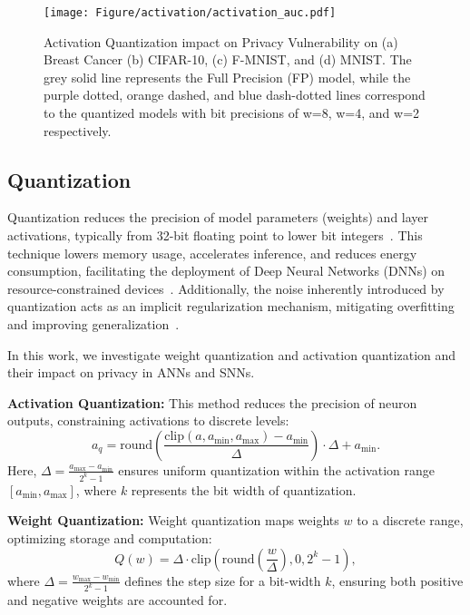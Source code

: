 \begin{figure*}[ht]
    \centering
    \texttt{[image: Figure/activation/activation\_auc.pdf]}
    \caption{Activation Quantization impact on Privacy Vulnerability  on (a) Breast Cancer (b) CIFAR-10, (c) F-MNIST, and (d) MNIST. The grey solid line represents the Full Precision (FP) model, while the purple dotted, orange dashed, and blue dash-dotted lines correspond to the quantized models with bit precisions of w=8, w=4, and w=2 respectively.}
    \label{fig:act_auc}
\end{figure*}

\subsection{Quantization}
\noindent
Quantization reduces the precision of model parameters (weights) and layer activations, typically from 32-bit floating point to lower bit integers~\cite{guo2018survey}. This technique lowers memory usage, accelerates inference, and reduces energy consumption, facilitating the deployment of Deep Neural Networks (DNNs) on resource-constrained devices~\cite{krestinskaya2023towards}. Additionally, the noise inherently introduced by quantization acts as an implicit regularization mechanism, mitigating overfitting and improving generalization~\cite{kang2024effect}.


In this work, we investigate weight quantization and activation quantization and their impact on privacy in ANNs and SNNs.

\textbf{Activation Quantization:} This method reduces the precision of neuron outputs, constraining activations to discrete levels:
\begin{equation}
    a_q = \text{round}\left(\frac{\text{clip}(a, a_{\text{min}}, a_{\text{max}}) - a_{\text{min}}}{\Delta}\right) \cdot \Delta + a_{\text{min}}.
\end{equation}
Here, \( \Delta = \frac{a_{\text{max}} - a_{\text{min}}}{2^k - 1} \) ensures uniform quantization within the activation range \([a_{\text{min}}, a_{\text{max}}]\), where \( k \) represents the bit width of quantization.

\textbf{Weight Quantization:} Weight quantization maps weights \( w \) to a discrete range, optimizing storage and computation:
\begin{equation}
    Q(w) = \Delta \cdot \text{clip}\left(\text{round}\left(\frac{w}{\Delta}\right), 0, 2^k - 1\right),
\end{equation}
where \( \Delta = \frac{w_{\text{max}} - w_{\text{min}}}{2^k - 1} \) defines the step size for a bit-width \( k \), ensuring both positive and negative weights are accounted for.


